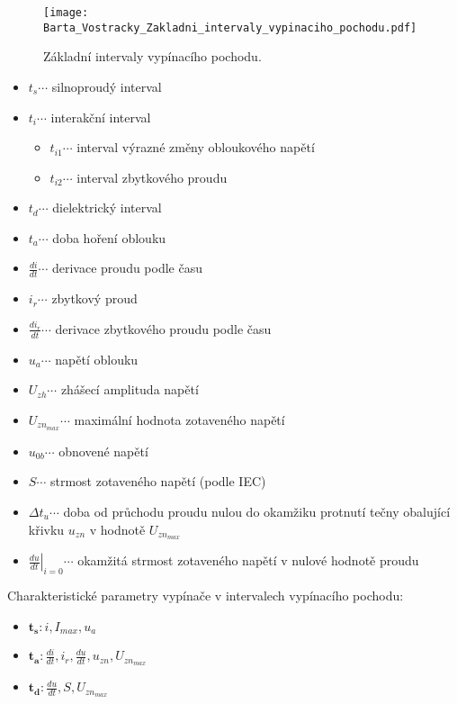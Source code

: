       \begin{figure*}
        \centering
        \texttt{[image: Barta\_Vostracky\_Zakladni\_intervaly\_vypinaciho\_pochodu.pdf]}
        \caption[Základní intervaly vypínacího pochodu.]{Základní intervaly vypínacího pochodu.}
        \label{epr:fig_zakl_int_vyp_pochodu}
      \end{figure*}

      \begin{itemize}[noitemsep]
        \item $t_s\cdots$     silnoproudý interval
        \item $t_i\cdots$     interakční interval
          \begin{itemize}
            \item $t_{i1}\cdots$  interval výrazné změny obloukového napětí
            \item $t_{i2}\cdots$  interval zbytkového proudu
          \end{itemize}
        \item $t_d\cdots$    dielektrický interval
        \item $t_a\cdots$    doba hoření oblouku
        \item $\frac{di}{dt}\cdots$ derivace proudu podle času
        \item $i_r\cdots$    zbytkový proud
        \item $\frac{di_r}{dt}\cdots$ derivace zbytkového proudu podle času
        \item $u_a\cdots$    napětí oblouku
        \item $U_{zh}\cdots$ zhášecí amplituda napětí
        \item $U_{zn_{max}}\cdots$ maximální hodnota zotaveného napětí
        \item $u_{0b}\cdots$ obnovené napětí
        \item $S\cdots$      strmost zotaveného napětí (podle IEC)
        \item $\Delta t_u\cdots$ doba od průchodu proudu nulou do okamžiku protnutí tečny obalující
              křivku $u_{zn}$ v hodnotě $U_{zn_{max}}$
        \item $\left.\frac{du}{dt}\right\rvert_{i=0}\cdots$ okamžitá strmost
              zotaveného napětí v nulové hodnotě proudu
      \end{itemize}
      Charakteristické parametry vypínače v intervalech vypínacího pochodu:
      \begin{itemize}[noitemsep]
        \item $\mathbf{t_s}: i, I_{max}, u_a$
        \item $\mathbf{t_a}: \frac{di}{dt},i_r, \frac{du}{dt}, u_{zn}, U_{zn_{max}}$
        \item $\mathbf{t_d}: \frac{du}{dt}, S, U_{zn_{max}}$
      \end{itemize}

